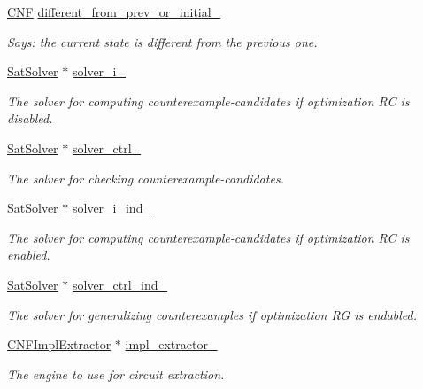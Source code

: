 \begin{DoxyCompactItemize}
\hyperlink{classCNF}{C\-N\-F} \hyperlink{classLearnSynthSAT_a1b0ed51f21b9fbb8cc0954e011968389}{different\-\_\-from\-\_\-prev\-\_\-or\-\_\-initial\-\_\-}
\begin{DoxyCompactList}\small\item\em Says\-: the current state is different from the previous one. \end{DoxyCompactList}\item 
\hyperlink{classSatSolver}{Sat\-Solver} $\ast$ \hyperlink{classLearnSynthSAT_a97e5c03d47cb7f237104472972b12c1c}{solver\-\_\-i\-\_\-}
\begin{DoxyCompactList}\small\item\em The solver for computing counterexample-\/candidates if optimization R\-C is disabled. \end{DoxyCompactList}\item 
\hyperlink{classSatSolver}{Sat\-Solver} $\ast$ \hyperlink{classLearnSynthSAT_abb28d64291205442f1df055049ef0195}{solver\-\_\-ctrl\-\_\-}
\begin{DoxyCompactList}\small\item\em The solver for checking counterexample-\/candidates. \end{DoxyCompactList}\item 
\hyperlink{classSatSolver}{Sat\-Solver} $\ast$ \hyperlink{classLearnSynthSAT_ae7f4a4e3546f46ad1256e203311226cf}{solver\-\_\-i\-\_\-ind\-\_\-}
\begin{DoxyCompactList}\small\item\em The solver for computing counterexample-\/candidates if optimization R\-C is enabled. \end{DoxyCompactList}\item 
\hyperlink{classSatSolver}{Sat\-Solver} $\ast$ \hyperlink{classLearnSynthSAT_ab81d5f53e078238feb1e948a5a5366ff}{solver\-\_\-ctrl\-\_\-ind\-\_\-}
\begin{DoxyCompactList}\small\item\em The solver for generalizing counterexamples if optimization R\-G is endabled. \end{DoxyCompactList}\item 
\hyperlink{classCNFImplExtractor}{C\-N\-F\-Impl\-Extractor} $\ast$ \hyperlink{classLearnSynthSAT_a1c7a39732a4ee3cd1ec877f2642046fc}{impl\-\_\-extractor\-\_\-}
\begin{DoxyCompactList}\small\item\em The engine to use for circuit extraction. \end{DoxyCompactList}\end{DoxyCompactItemize}
